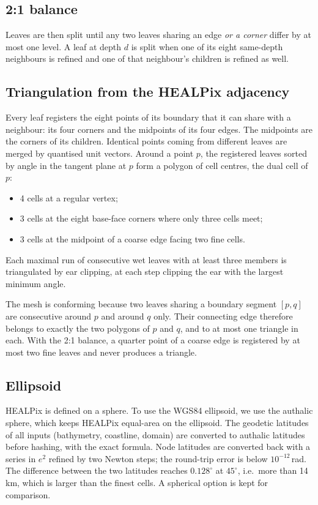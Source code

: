 \documentclass[11pt,a4paper]{article}
\begin{document}
\subsection{2:1 balance}
Leaves are then split until any two leaves sharing an edge \emph{or a corner}
differ by at most one level. A leaf at depth $d$ is split when one of its
eight same-depth neighbours is refined and one of that neighbour's children
is refined as well.

\subsection{Triangulation from the HEALPix adjacency}
Every leaf registers the eight points of its boundary that it can share with
a neighbour: its four corners and the midpoints of its four edges. The
midpoints are the corners of its children. Identical points coming from
different leaves are merged by quantised unit vectors. Around a point $p$,
the registered leaves sorted by angle in the tangent plane at $p$ form a
polygon of cell centres, the dual cell of $p$:
\begin{itemize}
\item 4 cells at a regular vertex;
\item 3 cells at the eight base-face corners where only three cells meet;
\item 3 cells at the midpoint of a coarse edge facing two fine cells.
\end{itemize}
Each maximal run of consecutive wet leaves with at least three members is
triangulated by ear clipping, at each step clipping the ear with the
largest minimum angle.

The mesh is conforming because two leaves sharing a boundary segment
$[p,q]$ are consecutive around $p$ and around $q$ only. Their connecting edge
therefore belongs to exactly the two polygons of $p$ and $q$, and to at most
one triangle in each. With the 2:1 balance, a quarter point of a coarse edge
is registered by at most two fine leaves and never produces a triangle.

\subsection{Ellipsoid}
HEALPix is defined on a sphere. To use the WGS84 ellipsoid, we use the
authalic sphere, which keeps HEALPix equal-area on the ellipsoid. The
geodetic latitudes of all inputs (bathymetry, coastline, domain) are
converted to authalic latitudes before hashing, with the exact formula.
Node latitudes are converted back with a series in $e^2$ refined by two
Newton steps; the round-trip error is below $10^{-12}$\,rad. The difference
between the two latitudes reaches $0.128^\circ$ at $45^\circ$, i.e.\ more
than 14\,km, which is larger than the finest cells. A spherical option is
kept for comparison.
\end{document}
